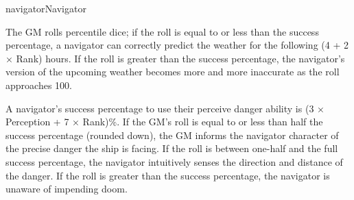 \begin{Skill}[1.1]{navigator}{Navigator}

The GM rolls percentile dice; if the roll is equal to or less than the
success percentage, a navigator can correctly predict the weather for
the following (4 + 2 × Rank) hours. If the roll is greater than the
success percentage, the navigator’s version of the upcoming weather
becomes more and more inaccurate as the roll approaches 100.


A navigator’s success percentage to use their perceive danger ability
is (3 × Perception + 7 × Rank)\%.  If the GM’s roll is equal to or
less than half the success percentage (rounded down), the GM informs
the navigator character of the precise danger the ship is facing. If
the roll is between one-half and the full success percentage, the
navigator intuitively senses the direction and distance of the danger.
If the roll is greater than the success percentage, the navigator is
unaware of impending doom.

\end{Skill}

